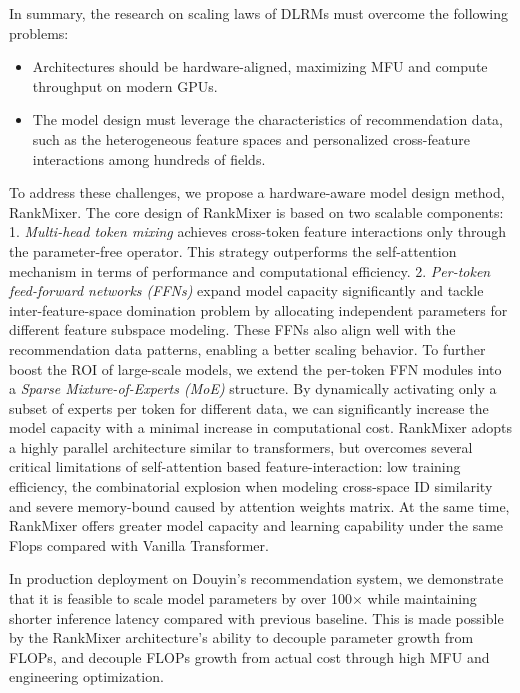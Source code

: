 In summary, the research on scaling laws of DLRMs must overcome the following problems:
\begin{itemize}[leftmargin=10pt]
    \item Architectures should be hardware-aligned, maximizing MFU and compute throughput on modern GPUs.

    \item The model design must leverage the characteristics of recommendation data, such as the heterogeneous feature spaces and personalized cross-feature interactions among hundreds of fields.
\end{itemize}


To address these challenges, we propose a hardware-aware model design method, RankMixer. The core design of RankMixer is based on two scalable components: 1. \textit{Multi-head token mixing} achieves cross-token feature interactions only through the parameter-free operator. This strategy outperforms the self-attention mechanism in terms of performance and computational efficiency. 2. \textit{Per-token feed-forward networks (FFNs)} expand model capacity significantly and tackle inter-feature-space domination problem by allocating independent parameters for different feature subspace modeling. These FFNs also align well with the recommendation data patterns, enabling a better scaling behavior.
To further boost the ROI of large-scale models, we extend the per-token FFN modules into a \textit{Sparse Mixture-of-Experts (MoE)} structure. By dynamically activating only a subset of experts per token for different data, we can significantly increase the model capacity with a minimal increase in computational cost. 
RankMixer adopts a highly parallel architecture similar to transformers, but overcomes several critical limitations of self-attention based feature-interaction: low training efficiency, the combinatorial explosion when modeling cross-space ID similarity and severe memory-bound caused by attention weights matrix. At the same time, RankMixer offers greater model capacity and learning capability under the same Flops compared with Vanilla Transformer.

In production deployment on Douyin’s recommendation system, we demonstrate that it is feasible to scale model parameters by over 100× while maintaining shorter inference latency compared with previous baseline. This is made possible by the RankMixer architecture’s ability to decouple parameter growth from FLOPs, and decouple FLOPs growth from actual cost through high MFU and engineering optimization.

